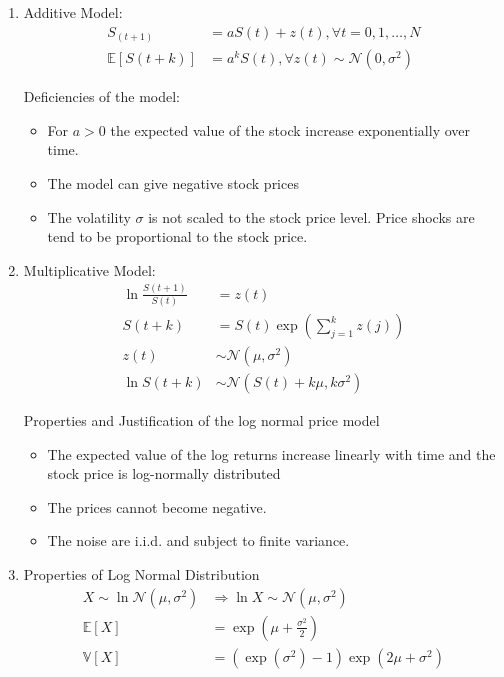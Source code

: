 \documentclass[12pt,twoside]{article}
\begin{document}
\begin{enumerate}
	\item Additive Model:
		\begin{align*}
			S_(t+1)	 &= a S(t) + z(t), \forall t=0,1,\ldots, N\\
			\mathbb{E}\left[S(t+k) \right] & = a^kS(t), \forall z(t) \sim \mathcal{N} (0, \sigma^2)
		\end{align*}			
		
		Deficiencies of the model:
		\begin{itemize}
			\item For $a>0$ the expected value of the stock increase exponentially over time.
			\item The model can give negative stock prices
			\item The volatility $\sigma$ is not scaled to the stock price level. Price shocks are tend to be proportional to the stock price.
		\end{itemize}
	
	\item Multiplicative Model:
		\begin{align*}
			\ln \frac{S(t+1)}{S(t)}	& = z(t)\\
			S(t+k) 							& = S(t) \exp\left(\sum_{j=1}^k z(j)\right)\\
			z(t)								& \sim \mathcal{N}(\mu, \sigma^2) \\
			\ln S(t+k)						& \sim \mathcal{N} \left(S(t) + k\mu, k\sigma^2\right)
		\end{align*}
		
		Properties and Justification of the log normal price model
		\begin{itemize}
			\item The expected value of the log returns increase linearly with time and the stock price is log-normally distributed
			\item The prices cannot become negative.
			\item The noise are i.i.d. and subject to finite variance.
		\end{itemize}
	
	\item Properties of Log Normal Distribution
	\begin{align*}
		X \sim \ln \mathcal{N}(\mu, \sigma^2) & \Rightarrow \ln X \sim \mathcal{N}(\mu, \sigma^2) \\
		\mathbb{E}[X] 	& = \exp\left(\mu+ \frac{\sigma^2}{2} \right)\\
		\mathbb{V}[X] 	& =\left(\exp(\sigma^2) - 1\right) \exp\left(2\mu+ \sigma^2 \right)
	\end{align*}


\end{enumerate}
\end{document}
